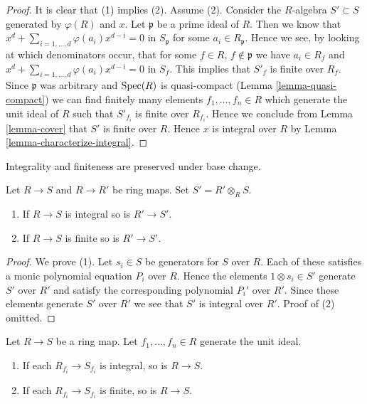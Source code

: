 \begin{proof}
It is clear that (1) implies (2). Assume (2). Consider the $R$-algebra
$S' \subset S$ generated by $\varphi(R)$ and $x$. Let $\mathfrak p$ be
a prime ideal of $R$. Then we know that
$x^d + \sum_{i = 1, \ldots, d} \varphi(a_i) x^{d - i} = 0$
in $S_{\mathfrak p}$ for some $a_i \in R_{\mathfrak p}$. Hence we see,
by looking at which denominators occur, that
for some $f \in R$, $f \not \in \mathfrak p$ we have
$a_i \in R_f$ and
$x^d + \sum_{i = 1, \ldots, d} \varphi(a_i) x^{d - i} = 0$
in $S_f$. This implies that $S'_f$ is finite over $R_f$.
Since $\mathfrak p$ was arbitrary and $\mathop{\mathrm{Spec}}(R)$ is quasi-compact
(Lemma \ref{lemma-quasi-compact}) we can find finitely many elements
$f_1, \ldots, f_n \in R$
which generate the unit ideal of $R$ such that $S'_{f_i}$ is finite
over $R_{f_i}$. Hence we conclude from Lemma \ref{lemma-cover} that
$S'$ is finite over $R$. Hence $x$ is integral over $R$ by
Lemma \ref{lemma-characterize-integral}.
\end{proof}

\begin{lemma}
\label{lemma-base-change-integral}
\begin{slogan}
Integrality and finiteness are preserved under base change.
\end{slogan}
Let $R \to S$ and $R \to R'$ be ring maps.
Set $S' = R' \otimes_R S$.
\begin{enumerate}
\item If $R \to S$ is integral so is $R' \to S'$.
\item If $R \to S$ is finite so is $R' \to S'$.
\end{enumerate}
\end{lemma}

\begin{proof}
We prove (1).
Let $s_i \in S$ be generators for $S$ over $R$.
Each of these satisfies a monic polynomial equation $P_i$
over $R$. Hence the elements $1 \otimes s_i \in S'$ generate
$S'$ over $R'$ and satisfy the corresponding polynomial
$P_i'$ over $R'$. Since these elements generate $S'$ over $R'$
we see that $S'$ is integral over $R'$.
Proof of (2) omitted.
\end{proof}

\begin{lemma}
\label{lemma-integral-local}
Let $R \to S$ be a ring map.
Let $f_1, \ldots, f_n \in R$ generate the unit ideal.
\begin{enumerate}
\item If each $R_{f_i} \to S_{f_i}$ is integral, so is $R \to S$.
\item If each $R_{f_i} \to S_{f_i}$ is finite, so is $R \to S$.
\end{enumerate}
\end{lemma}

